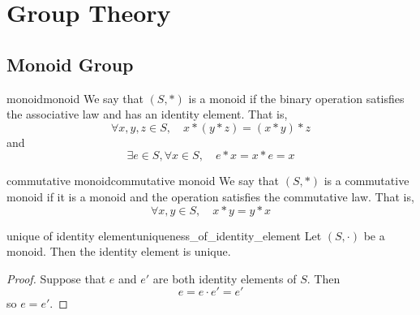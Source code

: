 \documentclass[11pt,lang=en]{elegantbook}
\begin{document}
\chapter{Group Theory}

\section{Monoid Group}

\begin{definition}{monoid}{monoid}
  We say that $(S, \ast)$ is a monoid if the binary operation satisfies the associative law and has an identity element. That is,
  \[
    \forall x, y, z \in S, \quad x \ast (y \ast z) = (x \ast y) \ast z
  \]
  and
  \[
    \exists e \in S, \forall x \in S, \quad e \ast x = x \ast e = x
  \]
\end{definition}

\begin{definition}{commutative monoid}{commutative monoid}
  We say that $(S, \ast)$ is a commutative monoid if it is a monoid and the operation satisfies the commutative law. That is,
  \[
    \forall x, y \in S, \quad x \ast y = y \ast x
  \]
\end{definition}

\begin{proposition}{unique of identity element}{uniqueness_of_identity_element}
  Let $(S, \cdot)$ be a monoid. Then the identity element is unique.
\end{proposition}
\begin{proof}
  Suppose that $e$ and $e'$ are both identity elements of $S$. Then
  \[
    e = e \cdot e' = e'
  \]
  so $e = e'$.
\end{proof}
\end{document}
